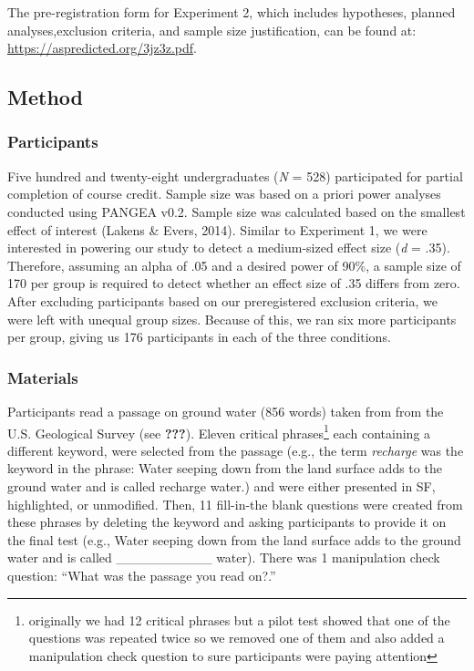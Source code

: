 \documentclass[english,pdf]{apa6}
\begin{document}
The pre-registration form for Experiment 2, which includes hypotheses, planned analyses,exclusion criteria, and sample size justification, can be found at: \url{https://aspredicted.org/3jz3z.pdf}.

\hypertarget{method-1}{%
\subsection{Method}\label{method-1}}

\hypertarget{participants-1}{%
\subsubsection{Participants}\label{participants-1}}

Five hundred and twenty-eight undergraduates (\emph{N} = 528) participated for partial completion of course credit. Sample size was based on a priori power analyses conducted using PANGEA v0.2. Sample size was calculated based on the smallest effect of interest (Lakens \& Evers, 2014). Similar to Experiment 1, we were interested in powering our study to detect a medium-sized effect size (\emph{d} = .35). Therefore, assuming an alpha of .05 and a desired power of 90\%, a sample size of 170 per group is required to detect whether an effect size of .35 differs from zero. After excluding participants based on our preregistered exclusion criteria, we were left with unequal group sizes. Because of this, we ran six more participants per group, giving us 176 participants in each of the three conditions.

\hypertarget{materials-1}{%
\subsubsection{Materials}\label{materials-1}}

Participants read a passage on ground water (856 words) taken from from the U.S. Geological Survey (see {\textbf{???}}). Eleven critical phrases\footnote{originally we had 12 critical phrases but a pilot test showed that one of the questions was repeated twice so we removed one of them and also added a manipulation check question to sure participants were paying attention} each containing a different keyword, were selected from the passage (e.g., the term \emph{recharge} was the keyword in the phrase: Water seeping down from the land surface adds to the ground water and is called recharge water.) and were either presented in SF, highlighted, or unmodified. Then, 11 fill-in-the blank questions were created from these phrases by deleting the keyword and asking participants to provide it on the final test (e.g., Water seeping down from the land surface adds to the ground water and is called \_\_\_\_\_\_\_\_\_\_ water). There was 1 manipulation check question: \enquote{What was the passage you read on?.}
\end{document}
